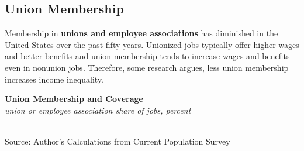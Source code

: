 \documentclass{report}
\makeatletter
\newcommand{\tbllink}[1]{\href{https://raw.githubusercontent.com/bdecon/US-chartbook/master/chartbook/data/#1}{\faTable}}
\newcommand*\short[1]{\expandafter\@gobbletwo\number\numexpr#1\relax}
\newcommand{\ctsbar}[5]{
		\addplot[ybar stacked, bar width=#5, draw opacity=0, fill=#1] 
			table [x=#2, y=#3, col sep=comma]{#4};}
\newcommand{\dateaxisticks}{
		date coordinates in=x, axis line style={draw=none},
		xmax={2022-01-30},
		max space between ticks=40,	    
		xtick={{1990-01-01}, {1992-01-01}, {1994-01-01}, 
			{1996-01-01}, {1998-01-01}, {2000-01-01}, 
			{2002-01-01}, {2004-01-01}, {2006-01-01},
			{2008-01-01}, {2010-01-01}, {2012-01-01}, {2014-01-01},
		    {2016-01-01}, {2018-01-01}, {2020-01-01}, {2022-01-01}},
		minor xtick={{1989-01-01}, {1991-01-01}, {1993-01-01},
			{1995-01-01}, {1997-01-01}, {1999-01-01}, 
			{2001-01-01}, {2003-01-01}, {2005-01-01}, {2007-01-01},
		    {2009-01-01}, {2011-01-01}, {2013-01-01}, {2015-01-01},
		    {2017-01-01}, {2019-01-01}, {2021-01-01}},
		enlarge y limits={0.06}, enlarge x limits={0.01},
		}
\newcommand{\bbar}[2]{extra #1 ticks = {{#2}}, extra #1 tick labels = ,
		extra #1 tick style = {grid=major, grid style={thick, black!25}},}
\newcommand{\rbars}{
		\fill[color=black!10] (axis cs:{1990-07-01},\pgfkeysvalueof{/pgfplots/ymin}) rectangle 
			(axis cs:{1991-03-01}, \pgfkeysvalueof{/pgfplots/ymax});
		\fill[color=black!10] (axis cs:{2007-12-01},\pgfkeysvalueof{/pgfplots/ymin}) rectangle 
			(axis cs:{2009-07-01}, \pgfkeysvalueof{/pgfplots/ymax});
		\fill[color=black!10] (axis cs:{2001-03-01},\pgfkeysvalueof{/pgfplots/ymin}) rectangle 
			(axis cs:{2001-11-01}, \pgfkeysvalueof{/pgfplots/ymax});
		\fill[color=black!10] (axis cs:{2020-02-01},\pgfkeysvalueof{/pgfplots/ymin}) rectangle 
			(axis cs:{2020-05-01}, \pgfkeysvalueof{/pgfplots/ymax});}
\makeatother
\begin{document}
{{\begin{minipage}{0.76\textwidth}
\subsection*{\color{black!70} \seriffont Union Membership}
\small Membership in \textbf{unions and employee associations} has diminished in the United States over the past fifty years. Unionized jobs typically offer higher wages and better benefits and union membership tends to increase wages and benefits even in nonunion jobs. Therefore, some research argues, less union membership increases income inequality. 


\vspace{3mm}

\normalsize \textbf{Union Membership and Coverage}\\
\footnotesize{\textit{union or employee association share of jobs, percent}}\\
\hspace*{-2mm} \\
\footnotesize{Source: Author's Calculations from Current Population Survey} \hfill \tbllink{union.csv}
\end{minipage}
\vspace{2mm}

}}
\end{document}
